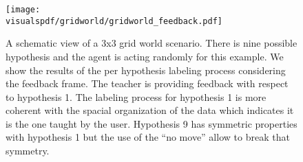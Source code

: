 \begin{figure}[!ht]
  \centering
  \texttt{[image: \\visualspdf/gridworld/gridworld\_feedback.pdf]}
  \caption{A schematic view of a 3x3 grid world scenario. There is nine possible hypothesis and the agent is acting randomly for this example. We show the results of the per hypothesis labeling process considering the feedback frame. The teacher is providing feedback with respect to hypothesis 1. The labeling process for hypothesis 1 is more coherent with the spacial organization of the data which indicates it is the one taught by the user. Hypothesis 9 has symmetric properties with hypothesis 1 but the use of the ``no move'' allow to break that symmetry.}
  \label{fig:appendix:gridworldfeedback}
\end{figure}








